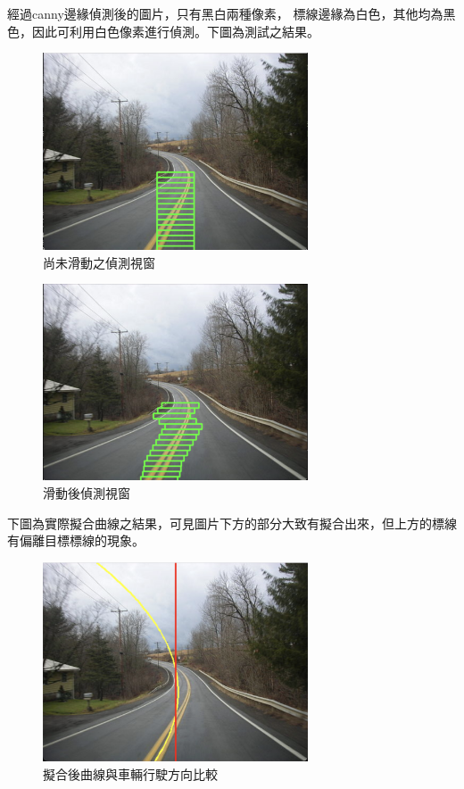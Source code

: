 \documentclass[12pt]{article}       %
\begin{document}
經過canny邊緣偵測後的圖片，只有黑白兩種像素，
標線邊緣為白色，其他均為黑色，因此可利用白色像素進行偵測。下圖為測試之結果。

\begin{figure}[H]
    \centering
    \includegraphics[width=0.7\textwidth]{42.jpg}     %
    \caption{尚未滑動之偵測視窗}    %
    \label{fig:42}    %
\end{figure}
\begin{figure}[H]
    \centering
    \includegraphics[width=0.7\textwidth]{43.jpg}     %
    \caption{滑動後偵測視窗}    %
    \label{fig:43}    %
\end{figure}

下圖為實際擬合曲線之結果，可見圖片下方的部分大致有擬合出來，但上方的標線有偏離目標標線的現象。

\begin{figure}[H]
    \centering
    \includegraphics[width=0.7\textwidth]{44.jpg}     %
    \caption{擬合後曲線與車輛行駛方向比較}    %
    \label{fig:44}    %
\end{figure}
\end{document}
